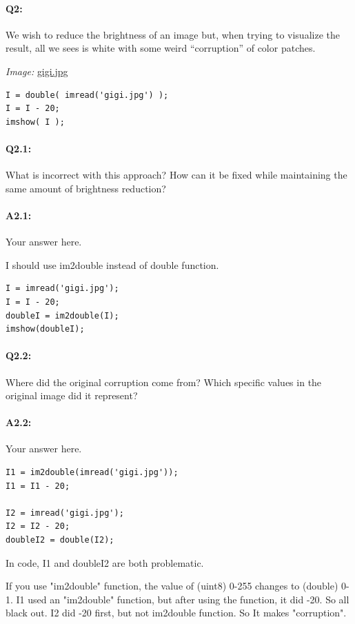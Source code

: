 \documentclass[11pt]{article}
\begin{document}
\pagebreak
\paragraph{Q2:} We wish to reduce the brightness of an image but, when trying to visualize the result, all we sees is white with some weird ``corruption'' of color patches.

\emph{Image:} \href{gigi.jpg}{gigi.jpg}

\begin{lstlisting}[style=Matlab-editor]
I = double( imread('gigi.jpg') );
I = I - 20;
imshow( I );
\end{lstlisting}

\paragraph{Q2.1:} What is incorrect with this approach? How can it be fixed while maintaining the same amount of brightness reduction?

\paragraph{A2.1:} Your answer here.

I should use im2double instead of double function.
\begin{lstlisting}[style=Matlab-editor]
I = imread('gigi.jpg');
I = I - 20;
doubleI = im2double(I);
imshow(doubleI);
\end{lstlisting}




\pagebreak
\paragraph{Q2.2:} Where did the original corruption come from? Which specific values in the original image did it represent?

\paragraph{A2.2:} Your answer here.

\begin{lstlisting}[style=Matlab-editor]
I1 = im2double(imread('gigi.jpg'));
I1 = I1 - 20;

I2 = imread('gigi.jpg');
I2 = I2 - 20;
doubleI2 = double(I2);
\end{lstlisting}
In code, I1 and doubleI2 are both problematic.

	If you use "im2double" function, the value of (uint8) 0-255 changes to (double) 0-1.  I1 used an "im2double" function, but after using the function, it did -20. So all black out. I2 did -20 first, but not im2double function. So It makes "corruption". 



\end{document}
